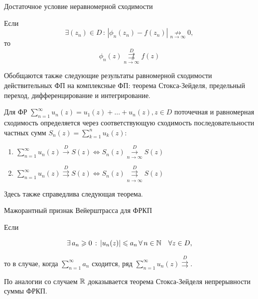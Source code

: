 \documentclass[../../main.tex]{subfiles}
\begin{document}
\begin{thm}{Достаточное условие неравномерной сходимости}
	\;
	
	Если
	\[ \exists (z_n) \in D\, :\, |\phi_n(z_n) - f(z_n)| \underset{n \to \infty}{\not \rightarrow} 0, \]
	то
	\[ \phi_n(z) \overset{D}{\underset{n \to \infty}{\not \rightrightarrows}} f(z) \]
\end{thm}

Обобщаются также следующие результаты равномерной сходимости действительных ФП на комплексные ФП: теорема Стокса-Зейделя, предельный переход, дифференцирование и интегрирование.

Для ФР $ \sum\limits_{n = 1}^{\infty} u_n(z) = u_1(z) + \ldots + u_n(z), z \in D $ поточечная и равномерная сходимость определяется через соответствующую сходимость последовательности частных сумм $ S_n(z) = \sum\limits_{k = 1}^{n} u_k(z): $

\begin{enumerate}
	\item $ \sum\limits_{n = 1}^{\infty} u_n(z) \overset{D}{\longrightarrow} S(z) \iff S_n(z) \overset{D}{\underset{n \to \infty}\longrightarrow} S(z) $
	
	\item $ \sum\limits_{n = 1}^{\infty} u_n(z) \overset{D}\rightrightarrows S(z) \iff S_n(z) \overset{D}{\underset{n \to \infty}\rightrightarrows} S(z) $
\end{enumerate}

Здесь также справедлива следующая теорема.

\begin{thm}{Мажорантный признак Вейерштрасса для ФРКП}
	\;
	
	Если
	
	\[ \exists\, a_n \geqslant 0\, :\, |u_n(z)| \leqslant a_n\, \forall\, n \in \mathbb{N} \quad \forall z \in D, \]
	
	то в случае, когда $ \sum\limits_{n = 1}^{\infty} a_n $ сходится, ряд $ \sum\limits_{n = 1}^{\infty} u_n(z) \overset{D}\rightrightarrows $.
\end{thm}

По аналогии со случаем $\mathbb{R}$ доказывается теорема Стокса-Зейделя непрерывности суммы ФРКП.
\end{document}
